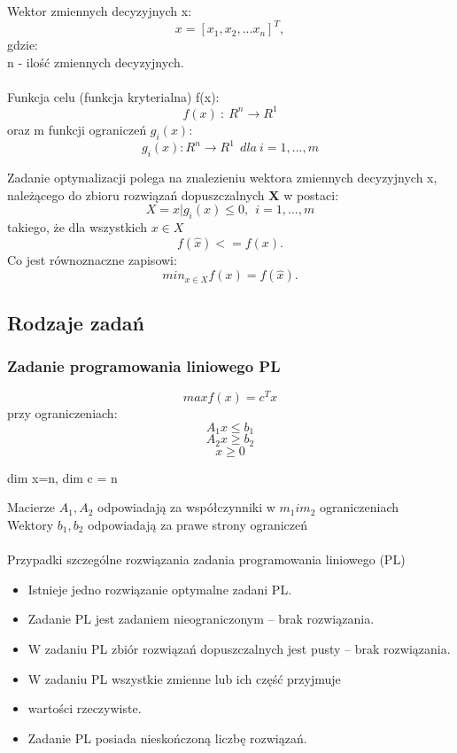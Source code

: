 \documentclass[a4paper,twoside]{report}
\begin{document}
Wektor zmiennych decyzyjnych x:
\[x=[x_1, x_2,...x_n]^T,\]
gdzie:\\
n - ilość zmiennych decyzyjnych.
\\\\
Funkcja celu (funkcja kryterialna) f(x):  
\[f(x)~:~R^n \longrightarrow R^1\]
oraz m funkcji ograniczeń $g_i(x)$:
\[g_i(x): R^n \longrightarrow R^1~~dla~i=1,...,m\]

Zadanie optymalizacji polega na znalezieniu wektora zmiennych decyzyjnych 
x, należącego do zbioru rozwiązań dopuszczalnych \textbf{X} w postaci:
\[X = {x|g_i(x) \le 0,~~i=1,...,m}\]
takiego, że dla wszystkich $x \in X$
\[f(\hat{x})<= f(x).\]
Co jest równoznaczne zapisowi:
\[min_{x \in X} f(x) = f(\hat{x}).\]

\subsection{Rodzaje zadań}


\subsubsection{Zadanie programowania liniowego PL} 

\[ max f(x) = c^T x \]
przy ograniczeniach: 
\[A_1 x \le b_1\]
\[A_2 x \ge b_2\]
\[x \ge 0\]
  
\begin{center}
dim x=n, dim c = n
\end{center}
Macierze $A_1, A_2$ odpowiadają za współczynniki w $m_1 i m_2$ ograniczeniach
\\
Wektory $b_1, b_2$ odpowiadają za prawe strony ograniczeń
\\ \\
Przypadki szczególne rozwiązania zadania programowania liniowego
(PL)

\begin{itemize}
\item Istnieje jedno rozwiązanie optymalne zadani PL.
\item Zadanie PL jest zadaniem nieograniczonym – brak rozwiązania.
\item W zadaniu PL zbiór rozwiązań dopuszczalnych jest pusty – brak
rozwiązania.
\item W zadaniu PL wszystkie zmienne lub ich część przyjmuje
\item wartości rzeczywiste.
\item Zadanie PL posiada nieskończoną liczbę rozwiązań.
\end{itemize}
 
\end{document}
